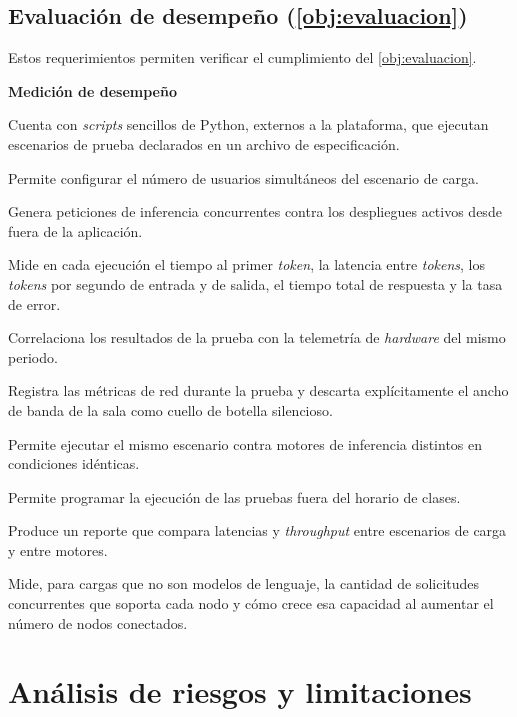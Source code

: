 \section[Evaluación de desempeño (Objetivo 4)]{Evaluación de desempeño (\cref{obj:evaluacion})}
\label{sec:req-evaluacion}

Estos requerimientos permiten verificar el cumplimiento del \cref{obj:evaluacion}.

\noindent\textbf{Medición de desempeño}
\begin{description}
\setlength{\itemsep}{4pt}
  \item[R4-01] Cuenta con \emph{scripts} sencillos de Python, externos a la plataforma, que ejecutan escenarios de prueba declarados en un archivo de especificación.
  \item[R4-02] Permite configurar el número de usuarios simultáneos del escenario de carga.
  \item[R4-03] Genera peticiones de inferencia concurrentes contra los despliegues activos desde fuera de la aplicación.
  \item[R4-04] Mide en cada ejecución el tiempo al primer \emph{token}, la latencia entre \emph{tokens}, los \emph{tokens} por segundo de entrada y de salida, el tiempo total de respuesta y la tasa de error.
  \item[R4-05] Correlaciona los resultados de la prueba con la telemetría de \emph{hardware} del mismo periodo.
  \item[R4-06] Registra las métricas de red durante la prueba y descarta explícitamente el ancho de banda de la sala como cuello de botella silencioso.
  \item[R4-07] Permite ejecutar el mismo escenario contra motores de inferencia distintos en condiciones idénticas.
  \item[R4-08] Permite programar la ejecución de las pruebas fuera del horario de clases.
  \item[R4-10] Produce un reporte que compara latencias y \emph{throughput} entre escenarios de carga y entre motores.
  \item[R4-11] Mide, para cargas que no son modelos de lenguaje, la cantidad de solicitudes concurrentes que soporta cada nodo y cómo crece esa capacidad al aumentar el número de nodos conectados.
\end{description}


\chapter{Análisis de riesgos y limitaciones}\label{anx:riesgos}

